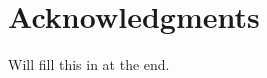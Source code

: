 



\bigskip

\begingroup
\let\clearpage\relax
\let\cleardoublepage\relax
\let\cleardoublepage\relax
\chapter*{Acknowledgments}
Will fill this in at the end.


\endgroup
